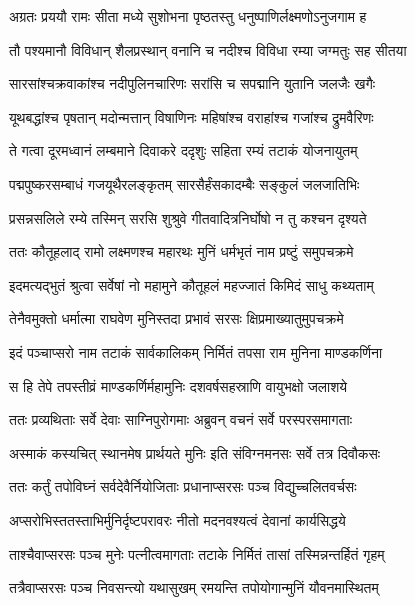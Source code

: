 
\twolineshloka
{अग्रतः प्रययौ रामः सीता मध्ये सुशोभना}
{पृष्ठतस्तु धनुष्पाणिर्लक्ष्मणोऽनुजगाम ह} %

\twolineshloka
{तौ पश्यमानौ विविधान् शैलप्रस्थान् वनानि च}
{नदीश्च विविधा रम्या जग्मतुः सह सीतया} %

\twolineshloka
{सारसांश्चक्रवाकांश्च नदीपुलिनचारिणः}
{सरांसि च सपद्मानि युतानि जलजैः खगैः} %

\twolineshloka
{यूथबद्धांश्च पृषतान् मदोन्मत्तान् विषाणिनः}
{महिषांश्च वराहांश्च गजांश्च द्रुमवैरिणः} %

\twolineshloka
{ते गत्वा दूरमध्वानं लम्बमाने दिवाकरे}
{ददृशुः सहिता रम्यं तटाकं योजनायुतम्} %

\twolineshloka
{पद्मपुष्करसम्बाधं गजयूथैरलङ्कृतम्}
{सारसैर्हंसकादम्बैः सङ्कुलं जलजातिभिः} %

\twolineshloka
{प्रसन्नसलिले रम्ये तस्मिन् सरसि शुश्रुवे}
{गीतवादित्रनिर्घोषो न तु कश्चन दृश्यते} %

\twolineshloka
{ततः कौतूहलाद् रामो लक्ष्मणश्च महारथः}
{मुनिं धर्मभृतं नाम प्रष्टुं समुपचक्रमे} %

\twolineshloka
{इदमत्यद्भुतं श्रुत्वा सर्वेषां नो महामुने}
{कौतूहलं महज्जातं किमिदं साधु कथ्यताम्} %

\twolineshloka
{तेनैवमुक्तो धर्मात्मा राघवेण मुनिस्तदा}
{प्रभावं सरसः क्षिप्रमाख्यातुमुपचक्रमे} %

\twolineshloka
{इदं पञ्चाप्सरो नाम तटाकं सार्वकालिकम्}
{निर्मितं तपसा राम मुनिना माण्डकर्णिना} %

\twolineshloka
{स हि तेपे तपस्तीव्रं माण्डकर्णिर्महामुनिः}
{दशवर्षसहस्राणि वायुभक्षो जलाशये} %

\twolineshloka
{ततः प्रव्यथिताः सर्वे देवाः साग्निपुरोगमाः}
{अब्रुवन् वचनं सर्वे परस्परसमागताः} %

\twolineshloka
{अस्माकं कस्यचित् स्थानमेष प्रार्थयते मुनिः}
{इति संविग्नमनसः सर्वे तत्र दिवौकसः} %

\twolineshloka
{ततः कर्तुं तपोविघ्नं सर्वदेवैर्नियोजिताः}
{प्रधानाप्सरसः पञ्च विद्युच्चलितवर्चसः} %

\twolineshloka
{अप्सरोभिस्ततस्ताभिर्मुनिर्दृष्टपरावरः}
{नीतो मदनवश्यत्वं देवानां कार्यसिद्धये} %

\twolineshloka
{ताश्चैवाप्सरसः पञ्च मुनेः पत्नीत्वमागताः}
{तटाके निर्मितं तासां तस्मिन्नन्तर्हितं गृहम्} %

\twolineshloka
{तत्रैवाप्सरसः पञ्च निवसन्त्यो यथासुखम्}
{रमयन्ति तपोयोगान्मुनिं यौवनमास्थितम्} %

